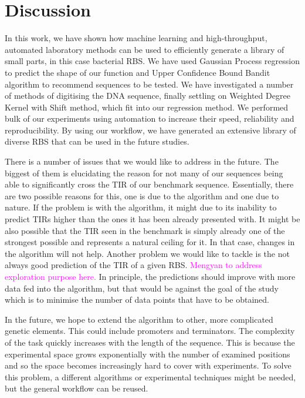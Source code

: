 \documentclass{article}
\newcommand{\mengyan}[1]{\textcolor{magenta}{#1}}
\begin{document}
\section{Discussion}

In this work, we have shown how machine learning and high-throughput, automated laboratory methods can be used to efficiently generate a library of small parts, in this case bacterial RBS. 
We have used Gaussian Process regression to predict the shape of our function and Upper Confidence Bound Bandit algorithm to recommend sequences to be tested.
We have investigated a number of methods of digitising the DNA sequence, finally settling on Weighted Degree Kernel with Shift method, which fit into our regression method.
We performed bulk of our experiments using automation to increase their speed, reliability and reproducibility.
By using our workflow, we have generated an extensive library of diverse RBS that can be used in the future studies.

There is a number of issues that we would like to address in the future.
The biggest of them is elucidating the reason for not many of our sequences being able to significantly cross the TIR of our benchmark sequence.
Essentially, there are two possible reasons for this, one is due to the algorithm and one due to nature.
If the problem is with the algorithm, it might due to its inability to predict TIRs higher than the ones it has been already presented with.
It might be also possible that the TIR seen in the benchmark is simply already one of the strongest possible and represents a natural ceiling for it. 
In that case, changes in the algorithm will not help.
Another problem we would like to tackle is the not always good prediction of the TIR of a given RBS.
\mengyan{Mengyan to address exploration purpose here.}
In principle, the predictions should improve with more data fed into the algorithm, but that would be against the goal of the study which is to minimise the number of data points that have to be obtained.

In the future, we hope to extend the algorithm to other, more complicated genetic elements.
This could include promoters and terminators.
The complexity of the task quickly increases with the length of the sequence.
This is because the experimental space grows exponentially with the number of examined positions and so the space becomes increasingly hard to cover with experiments.
To solve this problem, a different algorithms or experimental techniques might be needed, but the general workflow can be reused.
\end{document}
